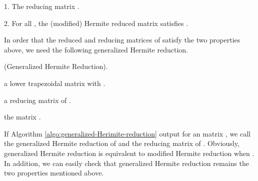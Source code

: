 \documentclass{sig-alternate}
\numberwithin{theorem}{section} \numberwithin{equation}{section}
\begin{document}
1. The reducing matrix .


2. For all , the (modified) Hermite reduced matrix  satisfies .


In order that the reduced and reducing matrices of  satisfy the two properties above, we
need the following generalized Hermite reduction. 

\begin{algorithm}[H]
\caption{(Generalized Hermite Reduction).}
\begin{algorithmic}[1]
\REQUIRE a lower trapezoidal matrix  with .

\ENSURE a reducing matrix  of .

\STATE {}

\label{algostep:ghr-hermite-reduction-start}







\STATE {\ \ \ \ \ \ \ \ }


\STATE {\ \ \ \ \ \ \ \ \ \ \ \ }















\label{algostep:generalized-2-hermite-reduction-start}

 \label{algostep:generalized-2-hermite-reduction-end}

\RETURN the  matrix .

\end{algorithmic}\label{algo:generalized-Herimite-reduction}
\end{algorithm}




If Algorithm \ref{algo:generalized-Herimite-reduction} output 
for an  matrix , we call  the generalized
Hermite reduction of  and  the reducing matrix of .
Obviously, generalized Hermite reduction is equivalent to modified
Hermite reduction when . In addition, we can easily check that
generalized Hermite reduction remains the two properties mentioned
above.
\end{document}

